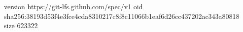 version https://git-lfs.github.com/spec/v1
oid sha256:38193d53f4e3fce4cda8310217c8f8c11066b1eaf6d26cc437202ac343a80818
size 623322
